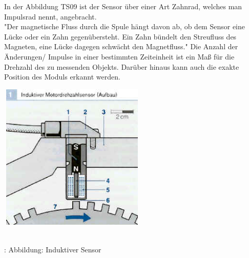 \documentclass{article}
\begin{document}
				\begin{flushleft}
					In der Abbildung TS09 ist der Sensor über einer Art Zahnrad, welches man Impulsrad nennt, angebracht.\\
					"Der magnetische Fluss durch die Spule hängt davon ab, ob dem Sensor eine Lücke oder ein Zahn gegenübersteht. Ein Zahn bündelt den Streufluss des Magneten, eine Lücke dagegen schwächt den Magnetfluss." \cite{TS08}  
					Die Anzahl der Änderungen/ Impulse in einer bestimmten Zeiteinheit ist ein Maß für die Drehzahl des zu messenden Objekts. Darüber hinaus kann auch die exakte Position des Moduls erkannt werden.\\						
				\end{flushleft}
			
			
		
				\begin{center}
					\includegraphics[width=7cm, height=7cm] {Images/Kapitel5/aufbau_induktiv.png}
					\caption{\\\cite{TS09}: Abbildung: Induktiver Sensor}
				\end{center}
				
\end{document}
